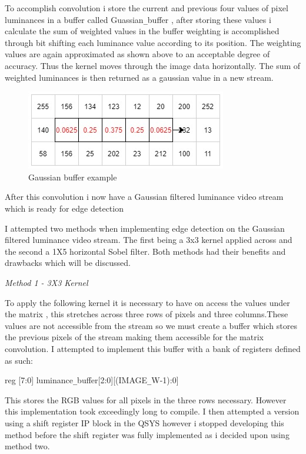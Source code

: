 \documentclass[10pt,twoside]{article}
\begin{document}
To accomplish convolution i store the current and previous four values of pixel luminances in a buffer called Guassian\verb|_|buffer , after storing these values i calculate the sum of weighted values in the buffer weighting is accomplished through bit shifting each luminance value according to its position. The weighting values are again approximated as shown above to an acceptable degree of accuracy. Thus the kernel moves through the image data horizontally. The sum of weighted luminances is then returned as a gaussian value in a new stream.

\begin{figure}[hbt]
\includegraphics[scale = 0.55]{GaussianBufferjpg.jpg}
\centering
\caption{Gaussian buffer example}
\label{fig:InitalDesign}
\end{figure}

After this convolution i now have a Gaussian filtered luminance video stream which is ready for edge detection

\newpage

I attempted two methods when implementing edge detection on the Gaussian filtered luminance video stream. The first being a 3x3 kernel applied across and the second a 1X5 horizontal Sobel filter. Both methods had their benefits and drawbacks which will be discussed. 

\textit{Method 1 - 3X3 Kernel}

To apply the following kernel it is necessary to have on access the values under the matrix , this stretches across three rows of pixels and three columns.These values are not accessible from the stream so we must create a buffer which stores the previous pixels of the stream making them accessible for the matrix convolution. I attempted to implement this buffer with a bank of registers defined as such:

reg [7:0] luminance\verb|_|buffer[2:0][(IMAGE\verb|_|W-1):0] 

This stores the RGB values for all pixels in the three rows necessary. However this implementation took exceedingly long to compile. I then attempted a version using a shift register IP block in the QSYS however i stopped developing this method before the shift register was fully implemented as i decided upon using method two.
\end{document}
